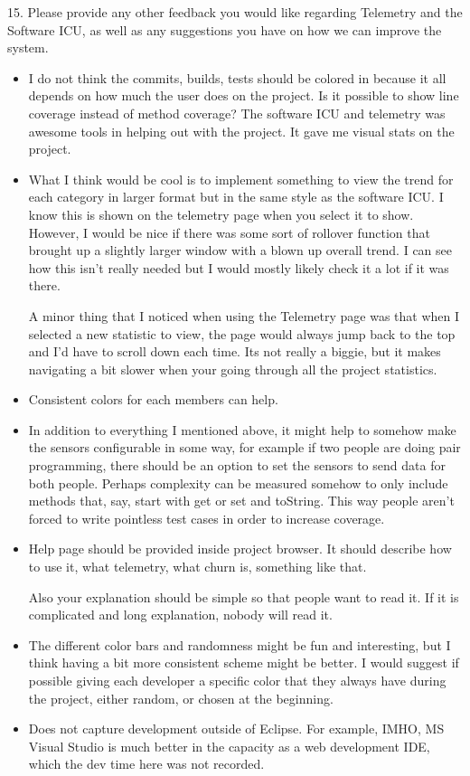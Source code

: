 15. Please provide any other feedback you would like regarding 
Telemetry and the Software ICU, as well as any suggestions 
you have on how we can improve the system. 
\begin{itemize}
\item I do not think the commits, builds, tests should be colored in because it all depends on how much the user does on the project.  Is it possible to show line coverage instead of method coverage? The software ICU and telemetry was awesome tools in helping out with the project.  It gave me visual stats on the project.
\item What I think would be cool is to implement something to view the trend for each category in larger format but in the same style as the software ICU. I know this is shown on the telemetry page when you select it to show. However, I would be nice if there was some sort of rollover function that brought up a slightly larger window with a blown up overall trend. I can see how this isn't really needed but I would mostly likely check it a lot if it was there. 

A minor thing that I noticed when using the Telemetry page was that when I selected a new statistic to view, the page would always jump back to the top and I'd have to scroll down each time. Its not really a biggie, but it makes navigating a bit slower when your going through all the project statistics.
\item Consistent colors for each members can help.
\item In addition to everything I mentioned above, it might help to somehow make the sensors configurable in some way, for example if two people are doing pair programming, there should be an option to set the sensors to send data for both people. Perhaps complexity can be measured somehow to only include methods that, say, start with get or set and toString. This way people aren't forced to write pointless test cases in order to increase coverage. 
\item Help page should be provided inside project browser. It should describe how to use it, what telemetry, what churn is, something like that. 

Also your explanation should be simple so that people want to read it. If it is complicated and long explanation, nobody will read it. 
\item The different color bars and randomness might be fun and interesting, but I think having a bit more consistent scheme might be better.  I would suggest if possible giving each developer a specific color that they always have during the project, either random, or chosen at the beginning.
\item Does not capture development outside of Eclipse.  For example, IMHO, MS Visual Studio is much better in the capacity as a web development IDE, which the dev time here was not recorded.
\end{itemize}


